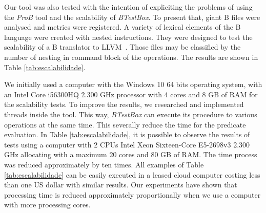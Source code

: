 \documentclass[runningheads]{llncs}
\begin{document}
Our tool was also tested with the intention of expliciting the problems of using the \textit{ProB} tool and the scalability of \textit{BTestBox}. To present that, giant B files were analysed and metrics were registered. A variety of lexical elements of the B language were created with nested instructions. They were designed to test the scalability of a B translator to LLVM~\cite{deharbebtestbox}. Those files may be classified by the number of nesting in command block of the operations. %
The results are shown in Table \ref{tab:escalabilidade}.  

We initially used a computer with the Windows 10 64 bits operating system, with an Intel Core i56300HQ 2.300 GHz processor with 4 cores and 8 GB of RAM for the scalability tests. %
%
To improve the results, we researched and implemented threads inside the tool.
This way, \textit{BTestBox} can execute its procedure to various operations at the same time.
This severally reduce the time for the predicate evaluation. In Table \ref{tab:escalabilidade}, it is possible to observe the results of tests using a computer with 2 CPUs Intel Xeon Sixteen-Core E5-2698v3 2.300 GHz allocating with a maximum 20 cores and 80 GB of RAM. The time process was reduced approximately by ten times.
All examples of Table \ref{tab:escalabilidade} can be easily executed in a leased cloud computer costing less than one US dollar with similar results.
Our experiments have shown that processing time is reduced approximately proportionally when we use a computer with more processing cores.

\end{document}
